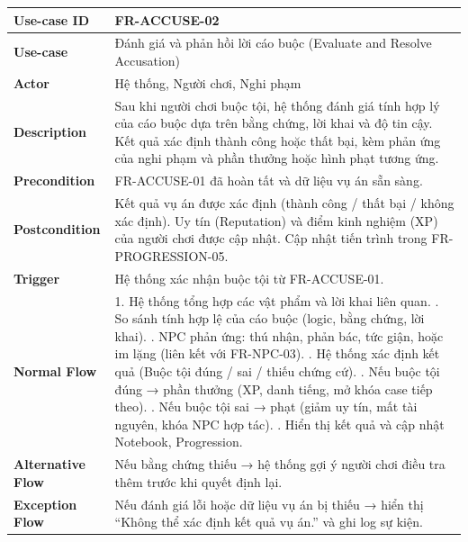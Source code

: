 \begin{table}[H]
\centering
\begin{tabular}{|p{4cm}|p{10cm}|}
\hline
\textbf{Use-case ID} & FR-ACCUSE-02 \\ \hline
\textbf{Use-case} & Đánh giá và phản hồi lời cáo buộc (Evaluate and Resolve Accusation) \\ \hline
\textbf{Actor} & Hệ thống, Người chơi, Nghi phạm \\ \hline
\textbf{Description} & Sau khi người chơi buộc tội, hệ thống đánh giá tính hợp lý của cáo buộc dựa trên bằng chứng, lời khai và độ tin cậy. Kết quả xác định thành công hoặc thất bại, kèm phản ứng của nghi phạm và phần thưởng hoặc hình phạt tương ứng. \\ \hline
\textbf{Precondition} & FR-ACCUSE-01 đã hoàn tất và dữ liệu vụ án sẵn sàng. \\ \hline
\textbf{Postcondition} & 
Kết quả vụ án được xác định (thành công / thất bại / không xác định). \newline
Uy tín (Reputation) và điểm kinh nghiệm (XP) của người chơi được cập nhật. \newline
Cập nhật tiến trình trong FR-PROGRESSION-05. \\ \hline
\textbf{Trigger} & Hệ thống xác nhận buộc tội từ FR-ACCUSE-01. \\ \hline
\textbf{Normal Flow} &
1. Hệ thống tổng hợp các vật phẩm và lời khai liên quan. \newline
2. So sánh tính hợp lệ của cáo buộc (logic, bằng chứng, lời khai). \newline
3. NPC phản ứng: thú nhận, phản bác, tức giận, hoặc im lặng (liên kết với FR-NPC-03). \newline
4. Hệ thống xác định kết quả (Buộc tội đúng / sai / thiếu chứng cứ). \newline
5. Nếu buộc tội đúng → phần thưởng (XP, danh tiếng, mở khóa case tiếp theo). \newline
6. Nếu buộc tội sai → phạt (giảm uy tín, mất tài nguyên, khóa NPC hợp tác). \newline
7. Hiển thị kết quả và cập nhật Notebook, Progression. \\ \hline
\textbf{Alternative Flow} &
Nếu bằng chứng thiếu → hệ thống gợi ý người chơi điều tra thêm trước khi quyết định lại. \\ \hline
\textbf{Exception Flow} &
Nếu đánh giá lỗi hoặc dữ liệu vụ án bị thiếu → hiển thị “Không thể xác định kết quả vụ án.” và ghi log sự kiện. \\ \hline
\end{tabular}
\end{table}


